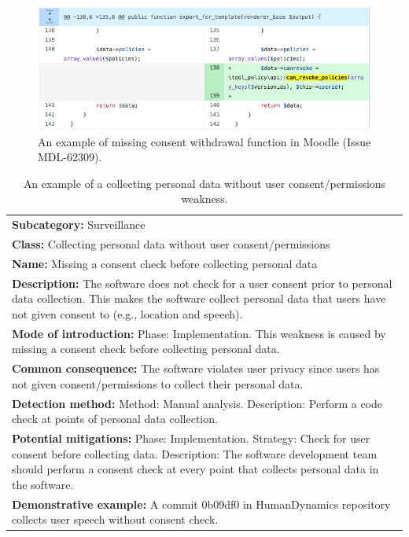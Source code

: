 \begin{figure}[ht]
	\centering
	\includegraphics[width=1.0\linewidth]{figures/mdl-missing-consent-withdrawal}
	\caption{An example of missing consent withdrawal function in Moodle (Issue MDL-62309).}
	\label{fig:mdl-missing-consent-withdrawal}
\end{figure}

\begin{table}[ht]
	\centering
	\caption{An example of a collecting personal data without user consent/permissions weakness.}
	\label{tab:cwe-template-missing-consent-check}
	\begin{tabular}{|p{8.5cm}|}
		\hline
		\textbf{Subcategory:} Surveillance \\
		\textbf{Class:} Collecting personal data without user consent/permissions \\
		\textbf{Name:} Missing a consent check before collecting personal data \\
		\textbf{Description:} The software does not check for a user consent prior to personal data collection. This makes the software collect personal data that users have not given consent to (e.g., location and speech). \\
		\textbf{Mode of introduction:} Phase: Implementation. This weakness is caused by missing a consent check before collecting personal data. \\
		\textbf{Common consequence:} The software violates user privacy since users has not given consent/permissions to collect their personal data. \\
		\textbf{Detection method:} Method: Manual analysis. Description: Perform a code check at points of personal data collection. \\
		\textbf{Potential mitigations:} Phase: Implementation. Strategy: Check for user consent before collecting data. Description: The software development team should perform a consent check at every point that collects personal data in the software. \\
		\textbf{Demonstrative example:} A commit 0b09df0 in HumanDynamics repository collects user speech without consent check. \\
		\hline
	\end{tabular}
\end{table}

